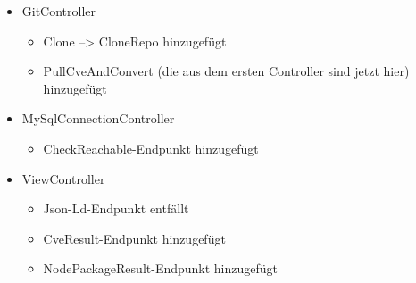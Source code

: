 \begin{itemize}
        \item GitController \label{api_controller:one} \\
            \begin{itemize}
                \item Clone --> CloneRepo hinzugefügt
                \item PullCveAndConvert (die aus dem ersten Controller sind jetzt hier) hinzugefügt
            \end{itemize}
        \item MySqlConnectionController \label{api_controller_2:five}
            \begin{itemize}
                \item CheckReachable-Endpunkt hinzugefügt
            \end{itemize}
        \item ViewController \label{api_controller:four}\\
            \begin{itemize}
                \item Json-Ld-Endpunkt entfällt
                \item CveResult-Endpunkt hinzugefügt
                \item NodePackageResult-Endpunkt hinzugefügt
            \end{itemize}
           
    \end{itemize}